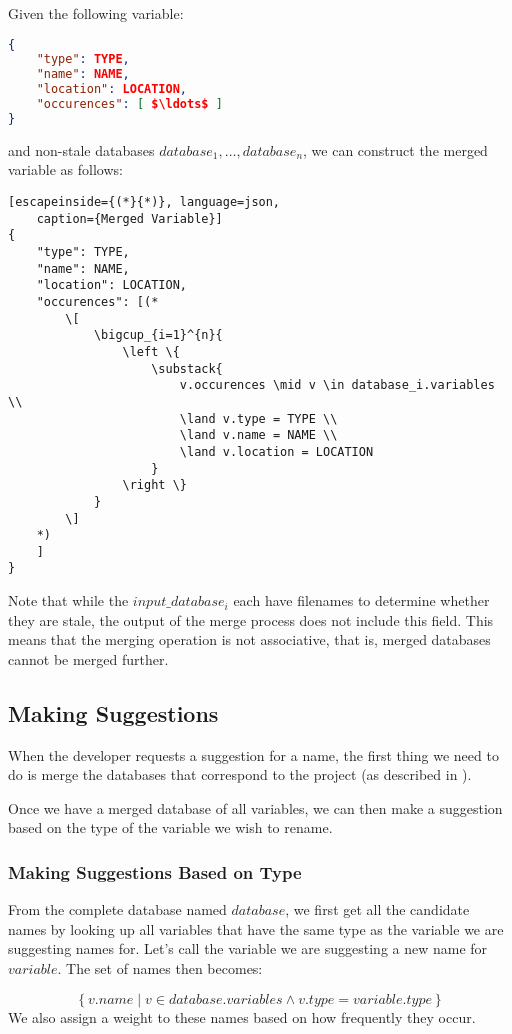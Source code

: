 Given the following variable:
\begin{lstlisting}[mathescape, language=json, caption={Example Variable}]
{
	"type": TYPE,
	"name": NAME,
	"location": LOCATION,
	"occurences": [ $\ldots$ ]
}
\end{lstlisting}
and non-stale databases $database_1, \ldots, database_n$, we can construct the
merged variable as follows:

\begin{lstlisting}[escapeinside={(*}{*)}, language=json,
	caption={Merged Variable}]
{
	"type": TYPE,
	"name": NAME,
	"location": LOCATION,
	"occurences": [(*
		\[
			\bigcup_{i=1}^{n}{
				\left \{
					\substack{
						v.occurences \mid v \in database_i.variables \\
						\land v.type = TYPE \\
						\land v.name = NAME \\
						\land v.location = LOCATION
					}
				\right \}
			}
		\]
	*)
	]
}
\end{lstlisting}
Note that while the $input\_database_i$ each have filenames to determine
whether they are stale, the output of the merge process does not include this
field. This means that the merging operation is not associative, that is, merged
databases cannot be merged further.

\subsection{Making Suggestions}
\label{sec:suggesting}

When the developer requests a suggestion for a name, the first thing we need to
do is merge the databases that correspond to the project (as described in
).

Once we have a merged database of all variables, we can then make a suggestion
based on the type of the variable we wish to rename.

\subsubsection{Making Suggestions Based on Type}

From the complete database named $database$, we first get all the candidate
names by looking up all variables that have the same type as the variable we are
suggesting names for. Let's call the variable we are suggesting a new name for
$variable$. The set of names then becomes:

\begin{equation}
	\left \{ v.name
			\mid v \in database.variables \land v.type = variable.type \right \}
\end{equation}
We also assign a weight to these names based on how frequently they occur.


